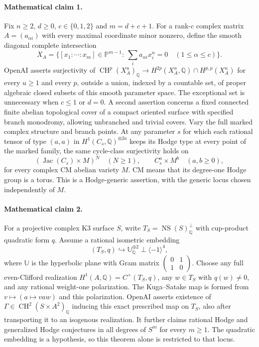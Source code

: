 \documentclass[11pt]{article}
\begin{document}
\paragraph{Mathematical claim 1.} Fix $n\ge2$, $d\ge0$, $c\in\{0,1,2\}$ and $m=d+c+1$. For a rank-$c$ complex matrix $A=(a_{\alpha i})$ with every maximal coordinate minor nonzero, define the smooth diagonal complete intersection
\[
X_A=\{[x_1:\cdots:x_m]\in\mathbb P^{m-1}:\ \sum_i a_{\alpha i}x_i^n=0\quad(1\le\alpha\le c)\}.
\]
OpenAI asserts surjectivity of $\operatorname{CH}^p(X_A^u)_{\mathbb Q}\to H^{2p}(X_A^u,\mathbb Q)\cap H^{p,p}(X_A^u)$ for every $u\ge1$ and every $p$, outside a union, indexed by a countable set, of proper algebraic closed subsets of this smooth parameter space. The exceptional set is unnecessary when $c\le1$ or $d=0$.
A second assertion concerns a fixed connected finite abelian topological cover of a compact oriented surface with specified branch monodromy, allowing unbranched and trivial covers. Vary the full marked complex structure and branch points. At any parameter $s$ for which each rational tensor of type $(a,a)$ in $H^1(C_s,\mathbb Q)^{\otimes 2a}$ keeps its Hodge type at every point of the marked family, the same cycle-class surjectivity holds on
\[
(\operatorname{Jac}(C_s)\times M)^N\quad(N\ge1),\qquad C_s^a\times M^b\quad(a,b\ge0),
\]
for every complex CM abelian variety $M$. CM means that its degree-one Hodge group is a torus. This is a Hodge-generic assertion, with the generic locus chosen independently of $M$.

\paragraph{Mathematical claim 2.} For a projective complex K3 surface $S$, write $T_S=\operatorname{NS}(S)_{\mathbb Q}^{\perp}$ with cup-product quadratic form $q$. Assume a rational isometric embedding
\[
(T_S,q)\hookrightarrow\mathbb U_{\mathbb Q}^{\oplus2}\perp\langle-1\rangle^4,
\]
where $\mathbb U$ is the hyperbolic plane with Gram matrix $\left(\begin{smallmatrix}0&1\\1&0\end{smallmatrix}\right)$. Choose any full even-Clifford realization $H^1(A,\mathbb Q)=C^+(T_S,q)$, any $w\in T_S$ with $q(w)\ne0$, and any rational weight-one polarization. The Kuga--Satake map is formed from $v\mapsto(a\mapsto vaw)$ and this polarization. OpenAI asserts existence of $\Gamma\in\operatorname{CH}^2(S\times A^2)_{\mathbb Q}$ inducing this exact prescribed map on $T_S$, also after transporting it to an isogenous realization. It further claims rational Hodge and generalized Hodge conjectures in all degrees of $S^m$ for every $m\ge1$. The quadratic embedding is a hypothesis, so this theorem alone is restricted to that locus.
\end{document}
